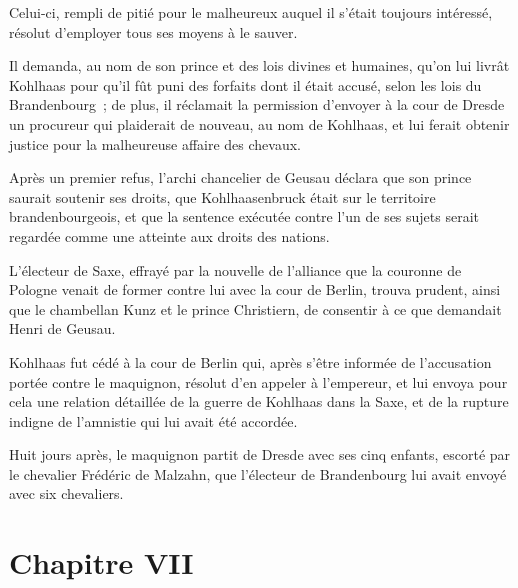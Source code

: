\documentclass[french,twoside]{book} %
\newcommand\chapteropen{} %
\newcommand\chapterclose{} %
\begin{document}
Celui-ci, rempli de pitié pour le malheureux auquel il s’était toujours intéressé, résolut d’employer tous ses moyens à le sauver.\par
Il demanda, au nom de son prince et des lois divines et humaines, qu’on lui livrât Kohlhaas pour qu’il fût puni des forfaits dont il était accusé, selon les lois du Brandenbourg ; de plus, il réclamait la permission d’envoyer à la cour de Dresde un procureur qui plaiderait de nouveau, au nom de Kohlhaas, et lui ferait obtenir justice pour la malheureuse affaire des chevaux.\par
Après un premier refus, l’archi chancelier de Geusau déclara que son prince saurait soutenir ses droits, que Kohlhaasenbruck était sur le territoire brandenbourgeois, et que la sentence exécutée contre l’un de ses sujets serait regardée comme une atteinte aux droits des nations.\par
L’électeur de Saxe, effrayé par la nouvelle de l’alliance que la couronne de Pologne venait de former contre lui avec la cour de Berlin, trouva prudent, ainsi que le chambellan Kunz et le prince Christiern, de consentir à ce que demandait Henri de Geusau.\par
Kohlhaas fut cédé à la cour de Berlin qui, après s’être informée de l’accusation portée contre le maquignon, résolut d’en appeler à l’empereur, et lui envoya pour cela une relation détaillée de la guerre de Kohlhaas dans la Saxe, et de la rupture indigne de l’amnistie qui lui avait été accordée.\par
Huit jours après, le maquignon partit de Dresde avec ses cinq enfants, escorté par le chevalier Frédéric de Malzahn, que l’électeur de Brandenbourg lui avait envoyé avec six chevaliers.
\chapterclose


\chapteropen
\chapter[Chapitre VII]{Chapitre VII}\renewcommand{\leftmark}{Chapitre VII}
\end{document}
